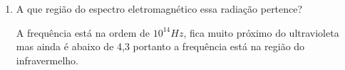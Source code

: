 \documentclass[a4paper]{article}
\begin{document}
\begin{enumerate}
\begin{itemize}
            \end{itemize}
    \item
        A que região do espectro eletromagnético essa radiação pertence?
            \begin{itemize}
                A frequência está na ordem de $10^{14} Hz$, fica muito próximo do ultravioleta mas ainda é abaixo de 4,3 portanto a frequência está na região do infravermelho.
            \end{itemize}
\end{enumerate}
\end{document}
